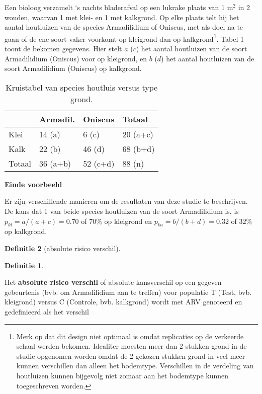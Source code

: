 \documentclass[
  12pt,dutch,coursenotes]{book}
\theoremstyle{definition}
\newtheorem{definition}{Definitie}[chapter]
\theoremstyle{definition}
\theoremstyle{definition}
\theoremstyle{remark}
\begin{document}
Een bioloog verzamelt `s nachts bladerafval op een lukrake plaats van 1 m\(^2\)
in 2 wouden, waarvan 1 met klei- en 1 met kalkgrond. Op elke plaats telt hij het aantal houtluizen van de species
Armadilidium of Oniscus, met als doel na te gaan of de ene soort vaker voorkomt op kleigrond dan op
kalkgrond\footnote{Merk op dat dit design niet optimaal is omdat replicaties op de verkeerde schaal werden bekomen. Idealiter moesten meer dan 2 stukken grond in de studie opgenomen worden omdat de 2 gekozen stukken grond in veel meer kunnen verschillen dan alleen het bodemtype. Verschillen in de verdeling van houtluizen kunnen bijgevolg niet zomaar aan het bodemtype kunnen toegeschreven worden.}. Tabel \ref{tab:cox} toont de bekomen gegevens. Hier stelt \(a\) (\(c\)) het aantal houtluizen van de soort Armadilidium (Oniscus) voor op kleigrond, en \(b\) (\(d\)) het aantal houtluizen van de soort Armadilidium (Oniscus) op kalkgrond.

\begin{table}[t]

\caption{\label{tab:cox}Kruistabel van species houtluis versus type grond.}
\centering
\begin{tabular}{llll}
\toprule
  & Armadil. & Oniscus & Totaal\\
\midrule
Klei & 14 (a) & 6 (c) & 20 (a+c)\\
Kalk & 22 (b) & 46 (d) & 68 (b+d)\\
Totaal & 36 (a+b) & 52 (c+d) & 88 (n)\\
\bottomrule
\end{tabular}
\end{table}

\textbf{Einde voorbeeld}

Er zijn verschillende manieren om de resultaten van deze studie te
beschrijven. De kans dat 1 van beide species houtluizen van de soort Armadilidium is, is \(p_{kl}=a/(a+c)=0.70\) of 70\% op kleigrond en \(p_{ka}=b/(b+d)=0.32\) of 32\% op kalkgrond.

\begin{definition}[absolute risico verschil]
\begin{definition}

\protect\hypertarget{def:unnamed-chunk-110}{}{\label{def:unnamed-chunk-110} \iffalse (absolute risico verschil) \fi{} }

\end{definition}
\end{definition}

Het \textbf{absolute risico verschil} of absolute kansverschil op een gegeven gebeurtenis (bvb. om Armadilidium aan te treffen) voor populatie T (Test, bvb. kleigrond) versus C (Controle, bvb. kalkgrond) wordt
met ARV genoteerd en gedefinieerd als het verschil
\end{document}
